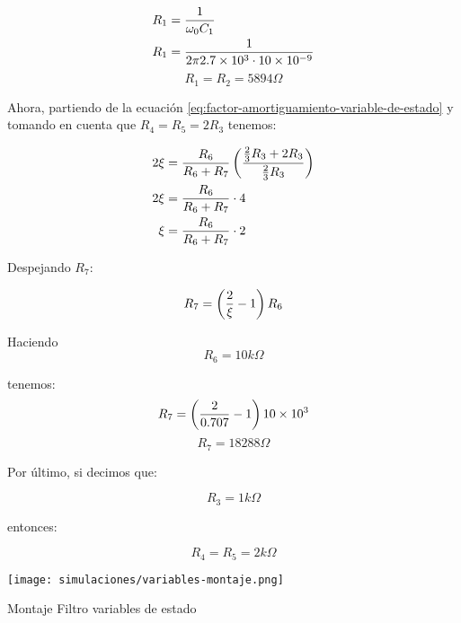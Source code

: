 \begin{align*}
    R_1 &= \frac{1}{\omega_0 C_1} \\
    R_1 &= \frac{1}{2\pi 2.7\times 10^3 \cdot 10\times 10^{-9}} \\
\end{align*}
\begin{equation}
    \boxed{R_1 = R_2 = 5894 \Omega}
\end{equation}

Ahora, partiendo de la ecuación \ref{eq:factor-amortiguamiento-variable-de-estado} y tomando en cuenta que $R_4 = R_5 = 2 R_3$ tenemos:

\begin{align*}
    2\xi &= \frac{R_6}{R_6 + R_7} \left( \frac{\frac{2}{3} R_3 + 2R_3}{\frac{2}{3} R_3} \right) \\
    2\xi &= \frac{R_6}{R_6 + R_7} \cdot 4  \\
    \xi &= \frac{R_6}{R_6 + R_7} \cdot 2 \\
\end{align*}

Despejando $R_7$:

\begin{align*}
    R_7 &= \left( \frac{2}{\xi} - 1 \right)R_6 \\
\end{align*}

Haciendo
 $$\boxed{R_6 = 10k\Omega}$$
 
tenemos:
\begin{align*}
    R_7 &= \left( \frac{2}{0.707} - 1 \right) 10\times 10^{3} \\
\end{align*}
\begin{equation}
    \boxed{R_7 = 18288\Omega}
\end{equation}

Por último, si decimos que:

$$\boxed{R_3 = 1k\Omega}$$

entonces:

\begin{equation*}
    \boxed{R_4 = R_5 = 2k\Omega}
\end{equation*}


\begin{ilustracion}[ht]
    \centering
    \texttt{[image: simulaciones/variables-montaje.png]}
    \caption{Montaje Filtro variables de estado}\label{ilus:sim-variables-montaje} 
\end{ilustracion}

